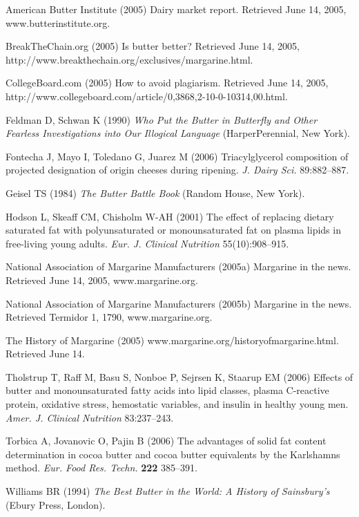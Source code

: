 \documentclass[serv,blindrev]{informs-serv}
\begin{document}
\begin{thebibliography}{}

American Butter Institute (2005) Dairy market report. Retrieved June
14, 2005, www.butterinstitute.org.

BreakTheChain.org (2005) Is butter better? Retrieved June 14, 2005,
http://www.breakthechain.org/exclusives/margarine.html.

CollegeBoard.com (2005)  How to avoid plagiarism. Retrieved June 14,
2005,
http://www.collegeboard.com/article/0,3868,2-10-0-10314,00.html.

Feldman D, Schwan K (1990) {\it Who Put the Butter in Butterfly
and Other Fearless Investigations into Our Illogical Language}
(HarperPerennial, New York).

Fontecha J, Mayo I, Toledano G, Juarez M (2006)
Triacylglycerol composition  of projected designation
of origin cheeses during ripening. {\it J. Dairy Sci.} 89:882--887.

Geisel TS (1984) {\it The Butter Battle Book}  (Random House, New York).

Hodson L, Skeaff CM, Chisholm W-AH (2001) The effect of
replacing dietary saturated fat with polyunsaturated or
monounsaturated fat on plasma lipids in free-living young adults.
{\it Eur. J. Clinical Nutrition} 55(10):908--915.

National Association of Margarine Manufacturers (2005a) Margarine in
the news. Retrieved June 14, 2005, www.margarine.org. 

National Association of Margarine Manufacturers (2005b) Margarine in
the news. Retrieved Termidor 1, 1790, www.margarine.org.

The History of Margarine (2005) 
www.margarine.org/historyofmargarine.html. Retrieved June 14. 

Tholstrup T, Raff M, Basu S, Nonboe P, Sejrsen K, Staarup EM (2006) 
Effects of butter and monounsaturated fatty acids
into lipid classes, plasma C-reactive protein, oxidative stress,
hemostatic variables, and insulin in healthy young men. {\it Amer. J.
Clinical Nutrition} 83:237--243.

Torbica A, Jovanovic O, Pajin B (2006) The advantages of solid
fat content determination in cocoa butter and cocoa butter
equivalents by the Karlshamns method. {\it Eur. Food Res. Techn.} {\bf 222}
385--391.

Williams BR (1994) {\it The Best Butter in the World: A History of
Sainsbury's} (Ebury Press, London).

\end{thebibliography}

\end{document}
